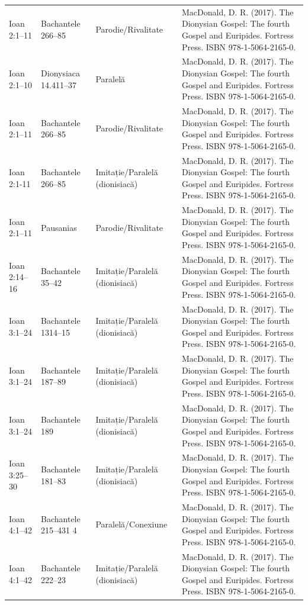 \documentclass[12pt,a4paper,twoside,openany]{book}
\begin{document}
\begin{longtable}{L{1.4cm}L{1.7cm}L{3.1cm}L{8.4cm}}
Ioan 2:1–11 & Bachantele 266–85 & Parodie/Rivalitate & MacDonald, D. R. (2017). The Dionysian Gospel: The fourth Gospel and Euripides. Fortress Press. ISBN 978-1-5064-2165-0. \\
Ioan 2:1–10 & Dionysiaca 14.411–37 & Paralelă & MacDonald, D. R. (2017). The Dionysian Gospel: The fourth Gospel and Euripides. Fortress Press. ISBN 978-1-5064-2165-0. \\
Ioan 2:1–11 & Bachantele 266–85 & Parodie/Rivalitate & MacDonald, D. R. (2017). The Dionysian Gospel: The fourth Gospel and Euripides. Fortress Press. ISBN 978-1-5064-2165-0. \\
Ioan 2:1-11 & Bachantele 266–85 & Imitație/Paralelă (dionisiacă) & MacDonald, D. R. (2017). The Dionysian Gospel: The fourth Gospel and Euripides. Fortress Press. ISBN 978-1-5064-2165-0. \\
Ioan 2:1–11 & Pausanias & Parodie/Rivalitate & MacDonald, D. R. (2017). The Dionysian Gospel: The fourth Gospel and Euripides. Fortress Press. ISBN 978-1-5064-2165-0. \\
Ioan 2:14–16 & Bachantele 35–42 & Imitație/Paralelă (dionisiacă) & MacDonald, D. R. (2017). The Dionysian Gospel: The fourth Gospel and Euripides. Fortress Press. ISBN 978-1-5064-2165-0. \\
Ioan 3:1–24 & Bachantele 1314–15 & Imitație/Paralelă (dionisiacă) & MacDonald, D. R. (2017). The Dionysian Gospel: The fourth Gospel and Euripides. Fortress Press. ISBN 978-1-5064-2165-0. \\
Ioan 3:1–24 & Bachantele 187–89 & Imitație/Paralelă (dionisiacă) & MacDonald, D. R. (2017). The Dionysian Gospel: The fourth Gospel and Euripides. Fortress Press. ISBN 978-1-5064-2165-0. \\
Ioan 3:1–24 & Bachantele 189 & Imitație/Paralelă (dionisiacă) & MacDonald, D. R. (2017). The Dionysian Gospel: The fourth Gospel and Euripides. Fortress Press. ISBN 978-1-5064-2165-0. \\
Ioan 3:25–30 & Bachantele 181–83 & Imitație/Paralelă (dionisiacă) & MacDonald, D. R. (2017). The Dionysian Gospel: The fourth Gospel and Euripides. Fortress Press. ISBN 978-1-5064-2165-0. \\
Ioan 4:1–42 & Bachantele 215–431 4 & Paralelă/Conexiune & MacDonald, D. R. (2017). The Dionysian Gospel: The fourth Gospel and Euripides. Fortress Press. ISBN 978-1-5064-2165-0. \\
Ioan 4:1–42 & Bachantele 222–23 & Imitație/Paralelă (dionisiacă) & MacDonald, D. R. (2017). The Dionysian Gospel: The fourth Gospel and Euripides. Fortress Press. ISBN 978-1-5064-2165-0. \\

\end{longtable}
\end{document}
